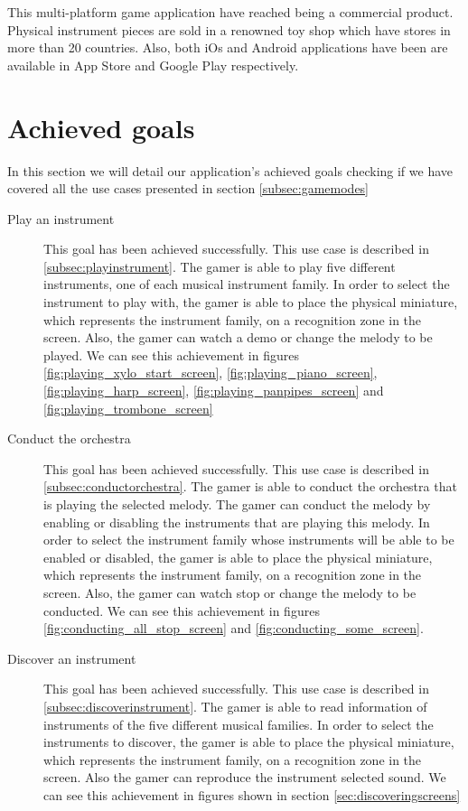 This multi-platform game application have reached being a commercial product. Physical instrument pieces are sold in a renowned toy shop which have stores in more than 20 countries. Also, both iOs and Android applications have been are available in App Store and Google Play respectively.

\section{Achieved goals}

In this section we will detail our application's achieved goals checking if we have covered all the use cases presented in section \ref{subsec:gamemodes} 

\begin{description}
\item[Play an instrument]
This goal has been achieved successfully. This use case is described in \ref{subsec:playinstrument}. The gamer is able to play five different instruments, one of each musical instrument family. In order to select the instrument to play with, the gamer is able to place the physical miniature, which represents the instrument family, on a recognition zone in the screen. Also, the gamer can watch a demo or change the melody to be played. We can see this achievement in figures \ref{fig:playing_xylo_start_screen}, \ref{fig:playing_piano_screen}, \ref{fig:playing_harp_screen}, \ref{fig:playing_panpipes_screen} and \ref{fig:playing_trombone_screen}

\item[Conduct the orchestra]
This goal has been achieved successfully. This use case is described in \ref{subsec:conductorchestra}. The gamer is able to conduct the orchestra that is playing the selected melody. The gamer can conduct the melody by enabling or disabling the instruments that are playing this melody. In order to select the instrument family whose instruments will be able to be enabled or disabled, the gamer is able to place the physical miniature, which represents the instrument family, on a recognition zone in the screen. Also, the gamer can watch stop or change the melody to be conducted. We can see this achievement in figures \ref{fig:conducting_all_stop_screen} and \ref{fig:conducting_some_screen}.

\item[Discover an instrument]
This goal has been achieved successfully. This use case is described in \ref{subsec:discoverinstrument}. The gamer is able to read information of instruments of the five different musical families. In order to select the instruments to discover, the gamer is able to place the physical miniature, which represents the instrument family, on a recognition zone in the screen. Also the gamer can reproduce the instrument selected sound. We can see this achievement in figures shown in section \ref{sec:discoveringscreens}


\end{description}
